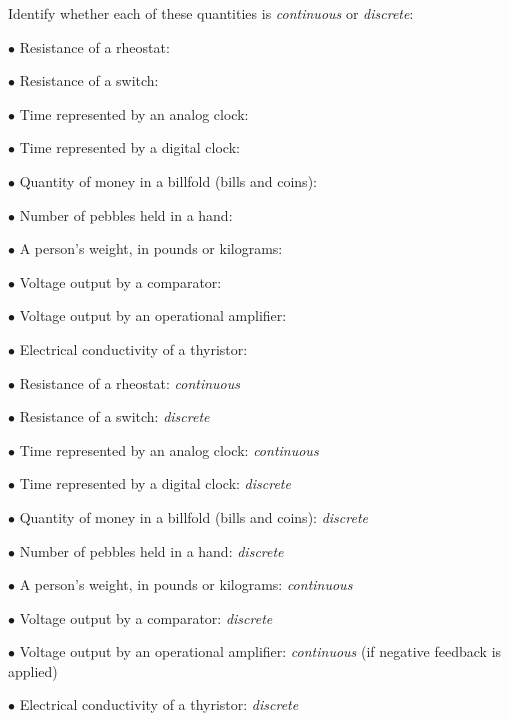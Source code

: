 

Identify whether each of these quantities is {\it continuous} or {\it discrete}:

\medskip
\goodbreak
\item{$\bullet$} Resistance of a rheostat:
\item{$\bullet$} Resistance of a switch:
\item{$\bullet$} Time represented by an analog clock:
\item{$\bullet$} Time represented by a digital clock:
\item{$\bullet$} Quantity of money in a billfold (bills and coins):
\item{$\bullet$} Number of pebbles held in a hand:
\item{$\bullet$} A person's weight, in pounds or kilograms:
\item{$\bullet$} Voltage output by a comparator:
\item{$\bullet$} Voltage output by an operational amplifier:
\item{$\bullet$} Electrical conductivity of a thyristor:
\medskip







\medskip
\goodbreak
\item{$\bullet$} Resistance of a rheostat: {\it continuous}
\item{$\bullet$} Resistance of a switch: {\it discrete}
\item{$\bullet$} Time represented by an analog clock: {\it continuous}
\item{$\bullet$} Time represented by a digital clock: {\it discrete}
\item{$\bullet$} Quantity of money in a billfold (bills and coins): {\it discrete}
\item{$\bullet$} Number of pebbles held in a hand: {\it discrete}
\item{$\bullet$} A person's weight, in pounds or kilograms: {\it continuous}
\item{$\bullet$} Voltage output by a comparator: {\it discrete}
\item{$\bullet$} Voltage output by an operational amplifier: {\it continuous} (if negative feedback is applied)
\item{$\bullet$} Electrical conductivity of a thyristor: {\it discrete}
\medskip


